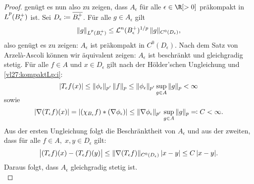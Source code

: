\begin{proof}
    genügt es nun also zu zeigen, dass $A_\epsilon$ für alle $\epsilon\in\R[>0]$
    präkompakt in $\Lpp(B^+_\epsilon)$ ist.
    Sei $D_\epsilon \defeq \setclosure{B^+_\epsilon}$.
    Für alle $g\in A_\epsilon$ gilt
    \[ \norm{g}_{\Lpp(B^+_\epsilon)}
        \leq \leb^n(B^+_\epsilon)^{1/p} \,
        \norm{g}_{C^0(D_\epsilon)}
    , \]
    also genügt es zu zeigen:
    $A_\epsilon$ ist präkompakt in $C^0(D_\epsilon)$.
    Nach dem Satz von Arzel\`a-Ascoli 
    können wir äquivalent zeigen: $A_\epsilon$ ist beschränkt und
    gleichgradig stetig. Für alle $f\in A$ und $x\in D_\epsilon$
    gilt nach der Hölder'schen Ungleichung und \ref{vl27:kompaktLp:i}:
    \[ \abs{T_\epsilon f(x)}
        \leq \norm{\phi_\epsilon}_{p'} \, \norm{f}_p
        \leq \norm{\phi_\epsilon}_{p'} \, \smash{\sup_{g\in A}}\, \norm{g}_p
        < \infty
    \]
    sowie
    \[ \abs*{\nabla(T_\epsilon f)(x)}
        =\abs*{(\chi_{B_\epsilon}f)\ast(\nabla\phi_\epsilon)}
        \leq \norm{\nabla\phi_\epsilon}_{p'} \,
            \sup_{g\in A}\, \norm{g}_p \eqdef C < \infty
    . \]
    Aus der ersten Ungleichung folgt die Beschränktheit von $A_\epsilon$
    und aus der zweiten, dass für alle $f\in A,\; x,y\in D_\epsilon$ gilt:
    \[ \abs[\big]{ (T_\epsilon f)(x) - (T_\epsilon f)(y) }
        \leq \norm{\nabla(T_\epsilon f)}_{C^0(D_\epsilon)} \, \abs{x-y}
        \leq C \, \abs{x-y}
    . \]
    Daraus folgt, dass $A_\epsilon$ gleichgradig stetig ist.
    \\
\end{proof}
